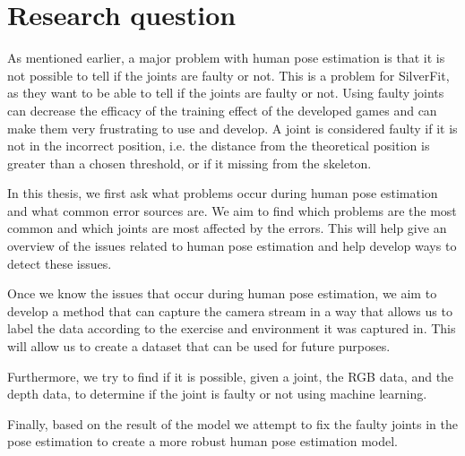 \section{Research question}

As mentioned earlier, a major problem with human pose estimation is that it is not possible to tell if the joints are faulty or not. This is a problem for SilverFit, as they want to be able to tell if the joints are faulty or not. Using faulty joints can decrease the efficacy of the training effect of the developed games and can make them very frustrating to use and develop. A joint is considered faulty if it is not in the incorrect position, i.e. the distance from the theoretical position is greater than a chosen threshold, or if it missing from the skeleton.

In this thesis, we first ask what problems occur during human pose estimation and what common error sources are. We aim to find which problems are the most common and which joints are most affected by the errors. This will help give an overview of the issues related to human pose estimation and help develop ways to detect these issues. 

Once we know the issues that occur during human pose estimation, we aim to develop a method that can capture the camera stream in a way that allows us to label the data according to the exercise and environment it was captured in. This will allow us to create a dataset that can be used for future purposes.

Furthermore, we try to find if it is possible, given a joint, the RGB data, and the depth data, to determine if the joint is faulty or not using machine learning. 

Finally, based on the result of the model we attempt to fix the faulty joints in the pose estimation to create a more robust human pose estimation model.
